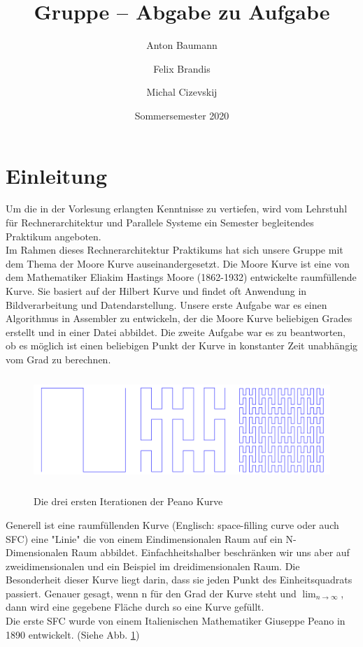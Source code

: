 \documentclass[course=erap]{aspdoc}
\author{Anton Baumann \and Felix Brandis \and Michal Cizevskij}
\date{Sommersemester 2020}  %
\title{Gruppe \theGroup{} -- Abgabe zu Aufgabe \theNumber}
\begin{document}
\maketitle

\section{Einleitung}

Um die in der Vorlesung erlangten Kenntnisse zu vertiefen, wird vom Lehrstuhl für Rechnerarchitektur und Parallele Systeme ein Semester begleitendes Praktikum angeboten.\\
Im Rahmen dieses Rechnerarchitektur Praktikums hat sich unsere Gruppe mit dem Thema der Moore Kurve auseinandergesetzt. Die Moore Kurve ist eine von dem Mathematiker Eliakim Hastings Moore (1862-1932) entwickelte raumfüllende Kurve. Sie basiert auf der Hilbert Kurve und findet oft Anwendung in Bildverarbeitung und Datendarstellung. Unsere erste Aufgabe war es einen Algorithmus in Assembler zu entwickeln, der die Moore Kurve beliebigen Grades erstellt und in einer Datei abbildet. Die zweite Aufgabe war es zu beantworten, ob es möglich ist einen beliebigen Punkt der Kurve in konstanter Zeit unabhängig vom Grad zu berechnen.
\begin{figure}[h]
\centering
    \includegraphics[width=12cm, height=4cm]{Peano}\\ %
    \caption{Die drei ersten Iterationen der Peano Kurve}
    \label{fig:Peano}
\end{figure}
Generell ist eine raumfüllenden Kurve (Englisch: space-filling curve oder auch SFC) eine "Linie" die von einem Eindimensionalen Raum auf ein N-Dimensionalen Raum abbildet. Einfachheitshalber beschränken wir uns aber auf zweidimensionalen und ein Beispiel im dreidimensionalen Raum. Die Besonderheit dieser Kurve liegt darin, dass sie jeden Punkt des Einheitsquadrats passiert. Genauer gesagt, wenn n für den Grad der Kurve steht und $\lim_{n\to\infty}$, dann wird eine gegebene Fläche durch so eine Kurve gefüllt.\\
Die erste SFC wurde von einem Italienischen Mathematiker Giuseppe Peano in 1890 entwickelt. (Siehe Abb. \ref{fig:Peano})
\end{document}
